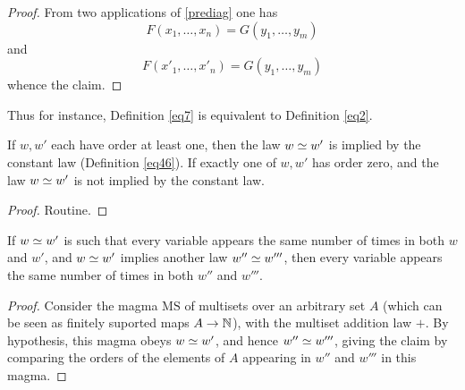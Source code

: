 \begin{proof}  From two applications of \eqref{prediag} one has
$$ F(x_1,\dots,x_n) = G(y_1,\dots,y_m)$$
and
$$ F(x'_1,\dots,x'_n) = G(y_1,\dots,y_m)$$
whence the claim.
\end{proof}

Thus for instance, Definition \ref{eq7} is equivalent to Definition \ref{eq2}.

\begin{theorem}\label{constant-impl}  If $w, w'$ each have order at least one, then the law $w \simeq w'$ is implied by the constant law (Definition \ref{eq46}).  If exactly one of $w, w'$ has order zero, and the law $w \simeq w'$ is not implied by the constant law.
\end{theorem}

\begin{proof} Routine.
\end{proof}

\begin{theorem}\label{variable-impl}\leanok  If $w \simeq w'$ is such that every variable appears the same number of times in both $w$ and $w'$, and $w \simeq w'$ implies another law $w'' \simeq w'''$, then every variable appears the same number of times in both $w''$ and $w'''$.
\end{theorem}

\begin{proof} Consider the magma $\mathrm{MS}$ of multisets over an arbitrary set $A$ (which can be seen as finitely suported maps $A\rightarrow \mathbb{N}$), with the multiset addition law $+$.  By hypothesis, this magma obeys $w \simeq w'$, and hence $w'' \simeq w'''$, giving the claim by comparing the orders of the elements of $A$ appearing in $w''$ and $w'''$ in this magma.
\end{proof}

